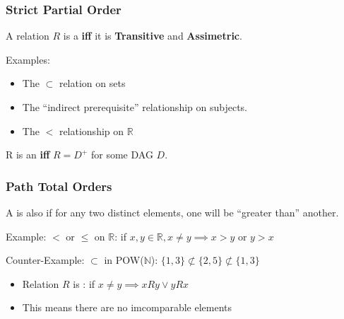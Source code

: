 \documentclass{beamer}
\begin{document}
\begin{frame}
  \frametitle{Strict Partial Order}

  {\larger

    A relation $R$ is a  {\bf iff} it
    is {\bf Transitive} and {\bf Assimetric}.

    \bigskip

    Examples:
    \begin{itemize}
    \item The $\subset$ relation on sets
    \item The ``indirect prerequisite'' relationship on subjects.
    \item The $<$ relationship on $\mathbb{R}$
    \end{itemize}

    \bigskip

    R is an  {\bf iff} $R = D^+$ for some DAG $D$.
  }
\end{frame}

\begin{frame}
  \frametitle{Path Total Orders}

  {\larger
    A  is also  if for
    any two distinct elements, one will be ``greater than'' another.

    \bigskip

    Example: $<$ or $\leq$ on $\mathbb{R}$: if $x,y \in \mathbb{R},
    x\neq y \implies x>y \text{ or } y>x$

    \bigskip

    Counter-Example: $\subset$ in POW($\mathbb{N}$): $\{1,3\} \not\subset \{2,5\} \not\subset \{1,3\}$

    \vfill

    \begin{itemize}
    \item Relation $R$ is : if $x \neq y \implies xRy \lor yRx$
    \item This means there are \alert{no imcomparable elements}
    \end{itemize}
  }
\end{frame}
\end{document}
